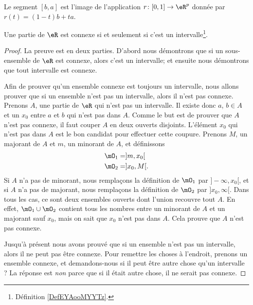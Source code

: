 Le segment $[b,a]$ est l'image de l'application $r\colon [0,1]\to \eR^p$ donnée par $r(t)=(1-t)b+ta$.

\begin{proposition} \label{PropInterssiConn}
    Une partie de $\eR$ est connexe si et seulement si c'est un intervalle\footnote{Définition \ref{DefEYAooMYYTz}.}.
\end{proposition}

\begin{proof}
    La preuve est en deux parties. D'abord nous démontrons que si un sous-ensemble de $\eR$ est connexe, alors c'est un intervalle; et ensuite nous démontrons que tout intervalle est connexe.

    Afin de prouver qu'un ensemble connexe est toujours un intervalle, nous allons prouver que si un ensemble n'est pas un intervalle, alors il n'est pas connexe. Prenons $A$, une partie de $\eR$ qui n'est pas un intervalle. Il existe donc $a$, $b\in A$ et un $x_0$ entre $a$ et $b$ qui n'est pas dans $A$. Comme le but est de prouver que $A$ n'est pas connexe, il faut couper $A$ en deux ouverts disjoints. L'élément $x_0$ qui n'est pas dans $A$ est le bon candidat pour effectuer cette coupure. Prenons $M$, un majorant de $A$ et $m$, un minorant de $A$, et définissons
    \begin{align*}
        \mO_1&=]m,x_0[\\
        \mO_2&=]x_0,M[.
    \end{align*}
    Si $A$ n'a pas de minorant, nous remplaçons la définition de $\mO_1$ par $]-\infty,x_0[$, et si $A$ n'a pas de majorant, nous remplaçons la définition de $\mO_2$ par $]x_0,\infty[$. Dans tous les cas, ce sont deux ensembles ouverts dont l'union recouvre tout $A$. En effet, $\mO_1\cup \mO_2$ contient tous les nombres entre un minorant de $A$ et un majorant sauf $x_0$, mais on sait que $x_0$ n'est pas dans $A$. Cela prouve que $A$ n'est pas connexe.

    Jusqu'à présent nous avons prouvé que si un ensemble n'est pas un intervalle, alors il ne peut pas être connexe. Pour remettre les choses à l'endroit, prenons un ensemble connexe, et demandons-nous si il peut être autre chose qu'un intervalle ? La réponse est \emph{non} parce que si il était autre chose, il ne serait pas connexe.


\end{proof}

